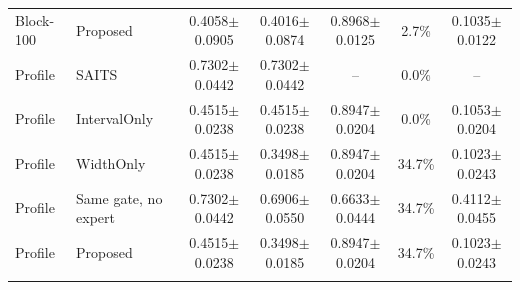 \begin{table}
\begin{tabular*}{\textwidth}{@{\extracolsep{\fill}}llccccc@{}}
Block-100 & Proposed & 0.4058$\pm$0.0905 & 0.4016$\pm$0.0874 & 0.8968$\pm$0.0125 & 2.7\% & 0.1035$\pm$0.0122 \\
\addlinespace[1.5pt]
Profile & SAITS & 0.7302$\pm$0.0442 & 0.7302$\pm$0.0442 & -- & 0.0\% & -- \\
Profile & IntervalOnly & 0.4515$\pm$0.0238 & 0.4515$\pm$0.0238 & 0.8947$\pm$0.0204 & 0.0\% & 0.1053$\pm$0.0204 \\
Profile & WidthOnly & 0.4515$\pm$0.0238 & 0.3498$\pm$0.0185 & 0.8947$\pm$0.0204 & 34.7\% & 0.1023$\pm$0.0243 \\
Profile & Same gate, no expert & 0.7302$\pm$0.0442 & 0.6906$\pm$0.0550 & 0.6633$\pm$0.0444 & 34.7\% & 0.4112$\pm$0.0455 \\
Profile & Proposed & 0.4515$\pm$0.0238 & 0.3498$\pm$0.0185 & 0.8947$\pm$0.0204 & 34.7\% & 0.1023$\pm$0.0243 \\
\addlinespace[1.5pt]
\bottomrule
\end{tabular*}
\end{table}
\clearpage

